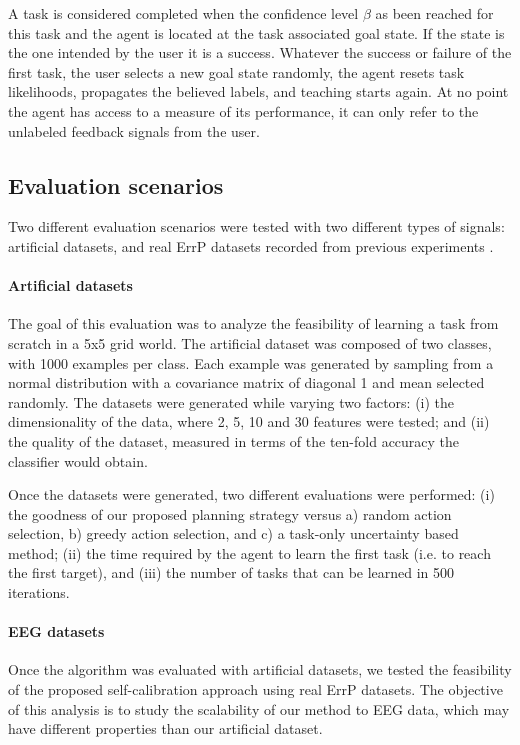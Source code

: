 A task is considered completed when the confidence level $\beta$ as been reached for this task and the agent is located at the task associated goal state. If the state is the one intended by the user it is a success. Whatever the success or failure of the first task, the user selects a new goal state randomly, the agent resets task likelihoods, propagates the believed labels, and teaching starts again. At no point the agent has access to a measure of its performance, it can only refer to the unlabeled feedback signals from the user.

\subsection{Evaluation scenarios}

Two different evaluation scenarios were tested with two different types of signals: artificial datasets, and real ErrP datasets recorded from previous experiments \cite{iturrate2013task}.

\paragraph{Artificial datasets}
The goal of this evaluation was to analyze the feasibility of learning a task from scratch in a 5x5 grid world. 
%
The artificial dataset was composed of two classes, with 1000 examples per class. Each example was generated by sampling from a normal distribution with a covariance matrix of diagonal 1 and mean selected randomly. The datasets were generated while varying two factors: (i) the dimensionality of the data, where 2, 5, 10 and 30 features were tested; and (ii) the quality of the dataset, measured in terms of the ten-fold accuracy the classifier would obtain. 

Once the datasets were generated, two different evaluations were performed: (i) the goodness of our proposed planning strategy versus a) random action selection, b) greedy action selection, and c) a task-only uncertainty based method; (ii) the time required by the agent to learn the first task (i.e. to reach the first target), and (iii) the number of tasks that can be learned in 500 iterations.

\paragraph{EEG datasets}
Once the algorithm was evaluated with artificial datasets, we tested the feasibility of the proposed self-calibration approach using real ErrP datasets. The objective of this analysis is to study the scalability of our method to EEG data, which may have different properties than our artificial dataset. 

